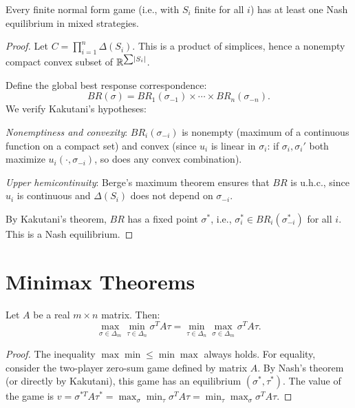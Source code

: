 \begin{theorem}[Nash, 1950]
\label{thm:nash}
Every finite normal form game (i.e., with $S_i$ finite for all $i$) has at least one
Nash equilibrium in mixed strategies.
\end{theorem}

\begin{proof}
Let $C = \prod_{i=1}^n \Delta(S_i)$. This is a product of simplices, hence a nonempty
compact convex subset of $\mathbb{R}^{\sum \left| S_i \right|}$.

Define the global best response correspondence:
\[
  BR(\sigma) = BR_1(\sigma_{-1}) \times \cdots \times BR_n(\sigma_{-n}).
\]
We verify Kakutani's hypotheses:

\emph{Nonemptiness and convexity}: $BR_i(\sigma_{-i})$ is nonempty (maximum of a
continuous function on a compact set) and convex (since $u_i$ is linear in $\sigma_i$:
if $\sigma_i, \sigma_i'$ both maximize $u_i(\cdot, \sigma_{-i})$, so does any convex
combination).

\emph{Upper hemicontinuity}: Berge's maximum theorem ensures that $BR$ is u.h.c., since
$u_i$ is continuous and $\Delta(S_i)$ does not depend on $\sigma_{-i}$.

By Kakutani's theorem, $BR$ has a fixed point $\sigma^*$, i.e.,
$\sigma_i^* \in BR_i(\sigma_{-i}^*)$ for all $i$. This is a Nash equilibrium.
\end{proof}

\section{Minimax Theorems}

\begin{theorem}
\label{thm:minimax}
Let $A$ be a real $m \times n$ matrix. Then:
\[
  \max_{\sigma \in \Delta_m} \min_{\tau \in \Delta_n} \sigma^T A \tau
  = \min_{\tau \in \Delta_n} \max_{\sigma \in \Delta_m} \sigma^T A \tau.
\]
\end{theorem}

\begin{proof}
The inequality $\max\min \leq \min\max$ always holds. For equality, consider the two-player
zero-sum game defined by matrix $A$. By Nash's theorem (or directly by Kakutani), this
game has an equilibrium $(\sigma^*, \tau^*)$. The value of the game is
$v = \sigma^{*T} A \tau^* = \max_\sigma \min_\tau \sigma^T A \tau =
\min_\tau \max_\sigma \sigma^T A \tau$.
\end{proof}

